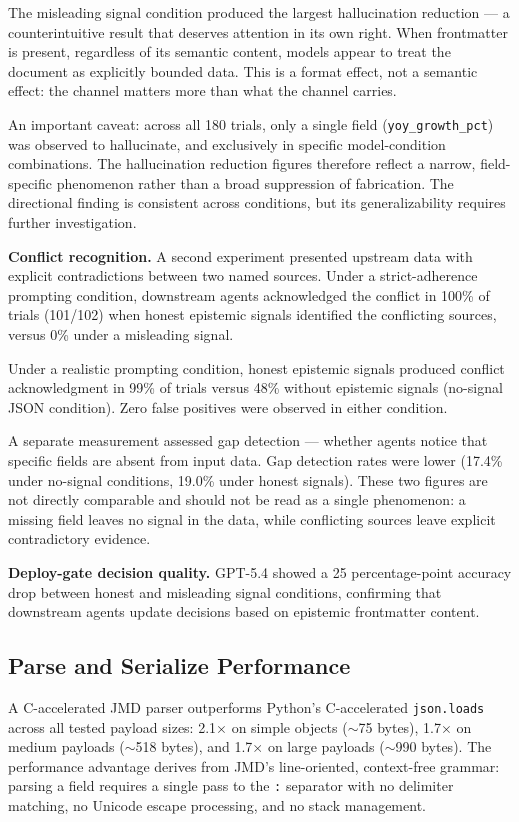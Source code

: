 \documentclass[11pt]{article}
\begin{document}
The misleading signal condition produced the largest hallucination reduction --- a counterintuitive result that deserves attention in its own right. When frontmatter is present, regardless of its semantic content, models appear to treat the document as explicitly bounded data. This is a format effect, not a semantic effect: the channel matters more than what the channel carries.

An important caveat: across all 180 trials, only a single field (\texttt{yoy\_growth\_pct}) was observed to hallucinate, and exclusively in specific model-condition combinations. The hallucination reduction figures therefore reflect a narrow, field-specific phenomenon rather than a broad suppression of fabrication. The directional finding is consistent across conditions, but its generalizability requires further investigation.

\textbf{Conflict recognition.} A second experiment presented upstream data with explicit contradictions between two named sources. Under a strict-adherence prompting condition, downstream agents acknowledged the conflict in 100\% of trials (101/102) when honest epistemic signals identified the conflicting sources, versus 0\% under a misleading signal.

Under a realistic prompting condition, honest epistemic signals produced conflict acknowledgment in 99\% of trials versus 48\% without epistemic signals (no-signal JSON condition). Zero false positives were observed in either condition.

A separate measurement assessed gap detection --- whether agents notice that specific fields are absent from input data. Gap detection rates were lower (17.4\% under no-signal conditions, 19.0\% under honest signals). These two figures are not directly comparable and should not be read as a single phenomenon: a missing field leaves no signal in the data, while conflicting sources leave explicit contradictory evidence.

\textbf{Deploy-gate decision quality.} GPT-5.4 showed a 25 percentage-point accuracy drop between honest and misleading signal conditions, confirming that downstream agents update decisions based on epistemic frontmatter content.

\subsection{Parse and Serialize Performance}

A C-accelerated JMD parser outperforms Python's C-accelerated \texttt{json.loads} across all tested payload sizes: 2.1$\times$ on simple objects ($\sim$75 bytes), 1.7$\times$ on medium payloads ($\sim$518 bytes), and 1.7$\times$ on large payloads ($\sim$990 bytes). The performance advantage derives from JMD's line-oriented, context-free grammar: parsing a field requires a single pass to the \texttt{:} separator with no delimiter matching, no Unicode escape processing, and no stack management.
\end{document}
